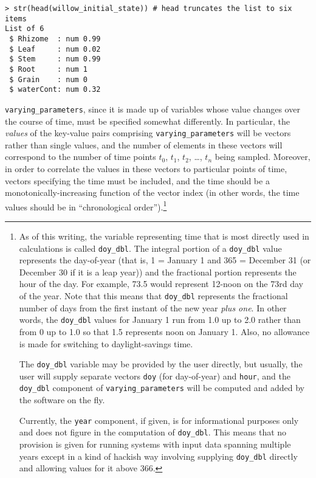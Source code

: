 \documentclass{article}
\newcommand{\code}[1]{\texttt{#1}}
\begin{document}
\begin{center}
\begin{lstlisting}
> str(head(willow_initial_state)) # head truncates the list to six items
List of 6
 $ Rhizome  : num 0.99
 $ Leaf     : num 0.02
 $ Stem     : num 0.99
 $ Root     : num 1
 $ Grain    : num 0
 $ waterCont: num 0.32
\end{lstlisting}
\end{center}

\code{varying\_parameters}, since it is made up of variables whose
value changes over the course of time, must be specified somewhat
differently.  In particular, the \emph{values} of the key-value pairs
comprising \code{varying\_parameters} will be vectors rather than
single values, and the number of elements in these vectors will
correspond to the number of time points $t_0$, $t_1$, $t_2$, \dots,
$t_n$ being sampled.  Moreover, in order to correlate the values in
these vectors to particular points of time, vectors specifying the
time must be included, and the time should be a
monotonically-increasing function of the vector index (in other words,
the time values should be in ``chronological order'').\footnote{As of
  this writing, the variable representing time that is most directly
  used in calculations is called \code{doy\_dbl}.  The integral
  portion of a \code{doy\_dbl} value represents the day-of-year (that
  is, 1 = January 1 and 365 = December 31 (or December 30 if it is a
  leap year)) and the fractional portion represents the hour of the
  day.  For example, 73.5 would represent 12-noon on the 73rd day of
  the year.  Note that this means that \code{doy\_dbl} represents the
  fractional number of days from the first instant of the new year
  \emph{plus one}.  In other words, the \code{doy\_dbl} values for
  January 1 run from 1.0 up to 2.0 rather than from 0 up to 1.0 so
  that 1.5 represents noon on January 1.  Also, no allowance is made
  for switching to daylight-savings time.

  The \code{doy\_dbl} variable may be provided by the user directly,
  but usually, the user will supply separate vectors \code{doy} (for
  day-of-year) and \code{hour}, and the \code{doy\_dbl} component of
  \code{varying\_parameters} will be computed and added by the
  software on the fly.

  Currently, the \code{year} component, if given, is for informational
  purposes only and does not figure in the computation of
  \code{doy\_dbl}.  This means that no provision is given for running
  systems with input data spanning multiple years except in a kind of
  hackish way involving supplying \code{doy\_dbl} directly and
  allowing values for it above 366.}
\end{document}
